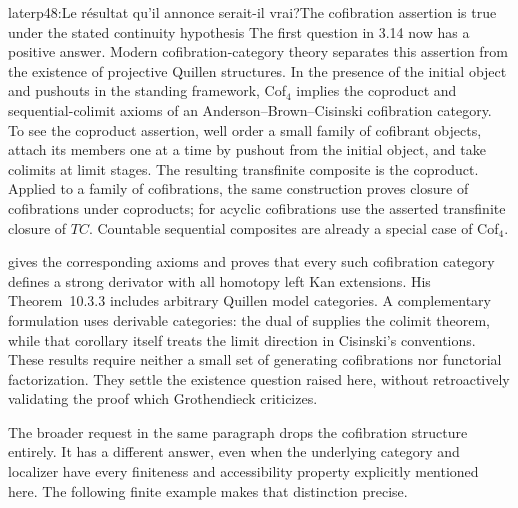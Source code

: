 \begin{dcomment}{later}{p48:Le résultat qu'il annonce serait-il vrai?}{The cofibration assertion is true under the stated continuity hypothesis}
The first question in 3.14 now has a positive answer. Modern cofibration-category theory separates this assertion from the existence of projective Quillen structures. In the presence of the initial object and pushouts in the standing framework, Cof$_4$ implies the coproduct and sequential-colimit axioms of an Anderson--Brown--Cisinski cofibration category. To see the coproduct assertion, well order a small family of cofibrant objects, attach its members one at a time by pushout from the initial object, and take colimits at limit stages. The resulting transfinite composite is the coproduct. Applied to a family of cofibrations, the same construction proves closure of cofibrations under coproducts; for acyclic cofibrations use the asserted transfinite closure of $TC$. Countable sequential composites are already a special case of Cof$_4$.

\citet[Lemma~1.6.2 and Theorem~10.3.2]{RadulescuBanu2009} gives the corresponding axioms and proves that every such cofibration category defines a strong derivator with all homotopy left Kan extensions. His Theorem~10.3.3 includes arbitrary Quillen model categories. A complementary formulation uses derivable categories: the dual of \citet[Corollary~6.21]{Cisinski2010} supplies the colimit theorem, while that corollary itself treats the limit direction in Cisinski's conventions. These results require neither a small set of generating cofibrations nor functorial factorization. They settle the existence question raised here, without retroactively validating the proof which Grothendieck criticizes.

The broader request in the same paragraph drops the cofibration structure entirely. It has a different answer, even when the underlying category and localizer have every finiteness and accessibility property explicitly mentioned here. The following finite example makes that distinction precise.
\end{dcomment}

